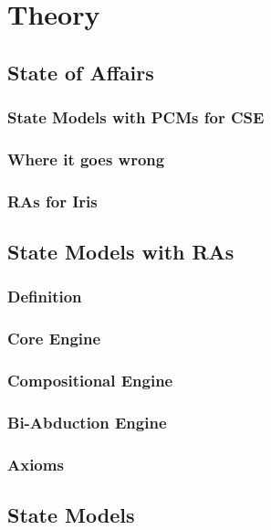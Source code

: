 \chapter{Theory}

\section{State of Affairs}

\subsection{State Models with PCMs for CSE}

\subsection{Where it goes wrong}

\subsection{RAs for Iris}

\section{State Models with RAs}

\subsection{Definition}

\subsection{Core Engine}

\subsection{Compositional Engine}

\subsection{Bi-Abduction Engine}

\subsection{Axioms}

\section{State Models}

